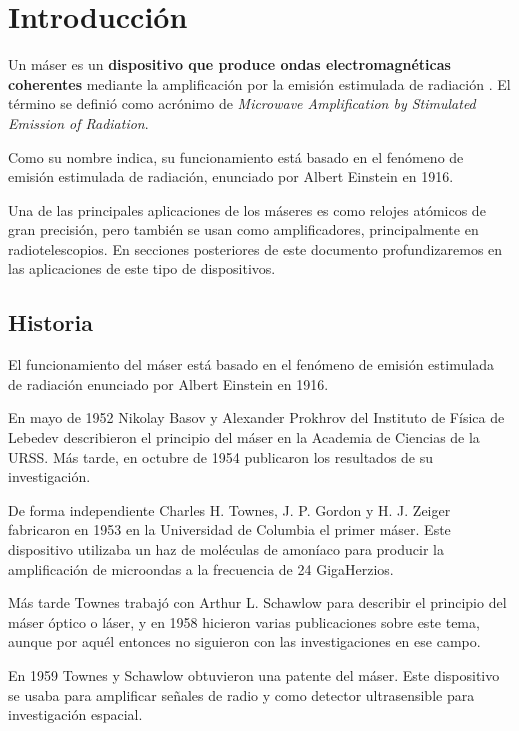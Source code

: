 \section{Introducción}
\label{introduccion}

Un m\'aser es un \textbf{dispositivo que produce ondas electromagn\'eticas coherentes} mediante la amplificaci\'on por la emisi\'on estimulada de radiaci\'on \cite{maserDefinition}. El t\'ermino se defini\'o como acr\'onimo de \textit{Microwave Amplification by Stimulated Emission of Radiation}.

Como su nombre indica, su funcionamiento está basado en el fenómeno de emisión estimulada de radiación, enunciado por Albert Einstein en 1916.

Una de las principales aplicaciones de los m\'aseres es como relojes at\'omicos de gran precisi\'on, pero tambi\'en se usan como amplificadores, principalmente en radiotelescopios. En secciones posteriores de este documento profundizaremos en las aplicaciones de este tipo de dispositivos.

\subsection{Historia}

El funcionamiento del m\'aser est\'a basado en el fen\'omeno de emisi\'on estimulada de radiaci\'on enunciado por Albert Einstein en 1916. 

En mayo de 1952 Nikolay Basov y Alexander Prokhrov del Instituto de F\'isica de Lebedev describieron el principio del m\'aser en la Academia de Ciencias de la URSS. M\'as tarde, en octubre de 1954  publicaron los resultados de su investigaci\'on.

De forma independiente Charles H. Townes, J. P. Gordon y H. J. Zeiger fabricaron en 1953 en la Universidad de Columbia el primer m\'aser. Este dispositivo utilizaba un haz de mol\'eculas de amon\'iaco para producir la amplificaci\'on de microondas a la frecuencia de 24 GigaHerzios.

M\'as tarde Townes trabaj\'o con Arthur L. Schawlow para describir el principio del m\'aser \'optico o l\'aser, y en 1958 hicieron varias publicaciones sobre este tema, aunque por aqu\'el entonces no siguieron con las investigaciones en ese campo.

En 1959 Townes y Schawlow obtuvieron una patente del m\'aser. Este dispositivo se usaba para amplificar se\~nales de radio y como detector ultrasensible para investigaci\'on espacial.

